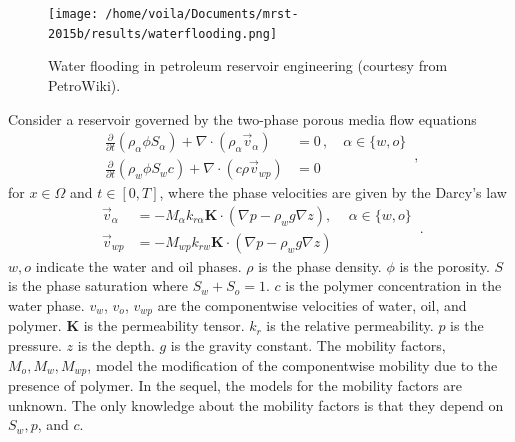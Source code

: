 \begin{figure}[htbp]
    \begin{center}
        \texttt{[image: /home/voila/Documents/mrst-2015b/results/waterflooding.png]}
        \caption{Water flooding in petroleum reservoir engineering (courtesy
        from PetroWiki).}
        \label{fig: polymer sketch}
    \end{center}
\end{figure}

Consider a reservoir governed by the two-phase porous media flow equations
\begin{equation}\begin{split}
    \frac{\partial }{\partial t} \left(\rho_\alpha \phi S_\alpha \right) + \nabla \cdot
    \left( \rho_\alpha \vec{v}_{\alpha} \right) &= 0\,, \quad \alpha \in \{w,o\}\\
    \frac{\partial}{\partial t}\left( \rho_w \phi S_w c \right) + \nabla \cdot
    \left( c \rho \vec{v}_{wp}\right) &= 0        
    \end{split}\,,
    \label{eqn: two phase polymer}
\end{equation}
for $x\in \Omega$ and $t\in [0,T]$,
where the phase velocities are given by the Darcy's law
\begin{equation}\begin{split}
    \vec{v}_\alpha &= - {M_\alpha} k_{r\alpha} \boldsymbol{K} \cdot (\nabla p - \rho_w g \nabla z), \, \quad \alpha \in \{w,o\}\\
    \vec{v}_{wp} &= -{M_{wp}} k_{rw} \boldsymbol{K} \cdot (\nabla p - \rho_{w} g \nabla z)
\end{split}\,.
\label{eqn: darcy law}
\end{equation}
$w, o$ indicate the water and oil phases.
$\rho$ is the phase density. $\phi$ is the porosity. $S$ is the phase saturation where
$S_w+S_o=1$.
$c$ is the polymer concentration in the water phase. $v_{w}$, $v_{o}$, 
$v_{wp}$ are the componentwise velocities of water, oil, and polymer. 
$\boldsymbol{K}$
is the permeability tensor. $k_{r}$ is the relative permeability. $p$ is the pressure. $z$ is the depth.
$g$ is the gravity constant. The mobility factors, $M_o, M_w, M_{wp}$, 
model the modification of the componentwise mobility due to the presence of polymer.
In the sequel, the models for the mobility factors are unknown. The only 
knowledge about the mobility factors is that they depend on $S_w, p$, and $c$.\\

